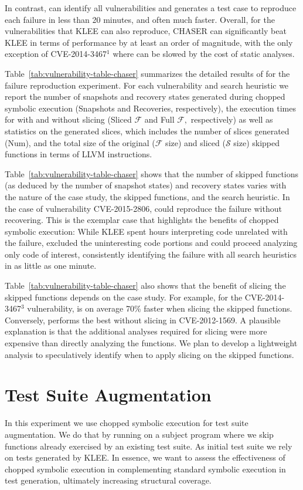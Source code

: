 In contrast, \toolname can identify all vulnerabilities and generates
a test case to reproduce each failure in less than 20 minutes, and
often much faster. Overall, for the vulnerabilities that KLEE can also
reproduce, CHASER can significantly beat KLEE in terms of performance
by at least an order of magnitude, with the only exception of
CVE-2014-3467$^1$ where \toolname can be slowed by the cost of static
analyses.

Table~\ref{tab:vulnerability-table-chaser} summarizes the detailed
results of \toolname for the failure reproduction experiment. For each
vulnerability and search heuristic we report the number of snapshots
and recovery states generated during chopped symbolic execution
(Snapshots and Recoveries, respectively), the execution times for
\toolname with and without slicing (Sliced $\mathcal{F}$ and Full
$\mathcal{F},$ respectively) as well as statistics on the generated
slices, which includes the number of slices generated (Num), and the
total size of the original ($\mathcal{F}$ size) and sliced
($\mathcal{S}$ size) skipped functions in terms of LLVM instructions.

Table~\ref{tab:vulnerability-table-chaser} shows that the number of
skipped functions (as deduced by the number of snapshot states) and
recovery states varies with the nature of the case study, the skipped
functions, and the search heuristic. In the case of vulnerability
CVE-2015-2806, \toolname could reproduce the failure without
recovering. This is the exemplar case that highlights the benefits of
chopped symbolic execution: While KLEE spent hours interpreting code
unrelated with the failure, \toolname excluded the uninteresting code
portions and could proceed analyzing only code of interest,
consistently identifying the failure with all search heuristics in as
little as one minute.

Table~\ref{tab:vulnerability-table-chaser} also shows that the benefit
of slicing the skipped functions depends on the case study. For
example, for the CVE-2014-3467$^3$ vulnerability, \toolname is on
average 70\% faster when slicing the skipped functions. Conversely,
\toolname performs the best without slicing in CVE-2012-1569. A
plausible explanation is that the additional analyses required for
slicing were more expensive than directly analyzing the functions. We
plan to develop a lightweight analysis to speculatively identify when
to apply slicing on the skipped functions.

\section{Test Suite Augmentation}
\label{sec:code-cover-impr}
In this experiment we use chopped symbolic execution for test suite
augmentation. We do that by running \toolname on a subject program
where we skip functions already exercised by an existing test
suite. As initial test suite we rely on tests generated by KLEE. In
essence, we want to assess the effectiveness of chopped symbolic
execution in complementing standard symbolic execution in test
generation, ultimately increasing structural coverage.

